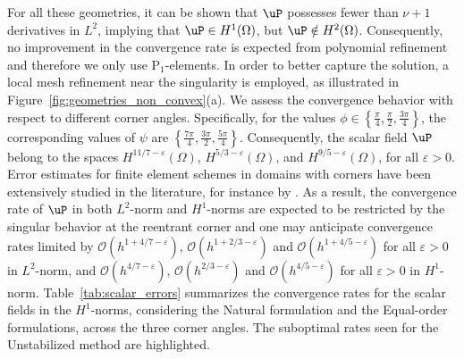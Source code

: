 For all these geometries, it can be shown that $\uP$ possesses fewer than $\nu+1$ derivatives in $L^{2}$, implying that $\uP \in H^{1}(\Omega)$, but $\uP \notin H^{2}(\Omega)$. Consequently, no improvement in the convergence rate is expected from polynomial refinement and therefore we only use $\text{P}_1$-elements.
In order to better capture the solution, a local mesh refinement near the singularity is employed, as illustrated in Figure~\ref{fig:geometries_non_convex}(a).
We assess the convergence behavior with respect to different corner angles. Specifically, for the values $ \phi \in \left\{ \frac{\pi}{4}, \frac{\pi}{2}, \frac{3\pi}{4} \right\} $, the corresponding values of $ \psi $ are $ \left\{ \frac{7\pi}{4}, \frac{3\pi}{2}, \frac{5\pi}{4} \right\} $. Consequently, the scalar field $ \uP $ belong to the spaces $ H^{11/7 - \varepsilon}(\Omega) $, $ H^{5/3 - \varepsilon}(\Omega) $, and $ H^{9/5 - \varepsilon}(\Omega) $, for all $ \varepsilon > 0 $. Error estimates for finite element schemes in domains with corners have been extensively studied in the literature, for instance by \cite{Babuska1972, Babuska1970}. As a result, the convergence rate of $ \uP $ in both $ L^{2} $-norm  and $ H^{1} $-norms are expected to be restricted by the singular behavior at the reentrant corner and one may anticipate convergence rates limited by $\mathcal{O}(h^{1+4/7-\varepsilon})$, $ \mathcal{O}(h^{1+2/3-\varepsilon}) $ and $ \mathcal{O}(h^{1+4/5-\varepsilon}) $ for all $ \varepsilon > 0 $ in $L^{2}$-norm, and $\mathcal{O}(h^{4/7-\varepsilon})$, $ \mathcal{O}(h^{2/3-\varepsilon}) $ and $ \mathcal{O}(h^{4/5-\varepsilon}) $ for all $ \varepsilon > 0 $ in $H^{1}$-norm. 
Table~\ref{tab:scalar_errors} summarizes the convergence rates for the scalar fields in the $ H^{1} $-norms, considering the Natural formulation and the Equal-order formulations, across the three corner angles. The suboptimal rates seen for the Unstabilized method are highlighted.

